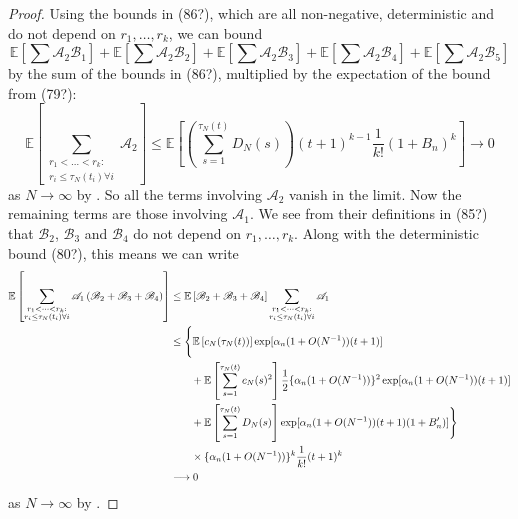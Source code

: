 \documentclass{article}
\newcommand{\E}{\mathbb{E}}
\newcommand{\1}[1]{\mathbbm{1}_{#1}}
\begin{document}
\begin{proof}
Using the bounds in (86?), which are all non-negative, deterministic and do not depend on $r_1,\dots,r_k$, we can bound
\begin{equation}
\E\left[ \sum \mathscr{A}_2 \mathscr{B}_1 \right] + \E\left[ \sum \mathscr{A}_2 \mathscr{B}_2 \right] + \E\left[ \sum \mathscr{A}_2 \mathscr{B}_3 \right] + \E\left[ \sum \mathscr{A}_2 \mathscr{B}_4 \right] + \E\left[ \sum \mathscr{A}_2 \mathscr{B}_5 \right]
\end{equation}
by the sum of the bounds in (86?), multiplied by the expectation of the bound from (79?):
\begin{equation}
\E\left[ \sum_{\substack{r_1 <\dots< r_k :\\ r_i \leq \tau_N(t_i) \forall i}} \mathscr{A}_2 \right]
\leq \E\left[ \left( \sum_{s=1}^{\tau_N(t)} D_N(s) \right) (t+1)^{k-1} \frac{1}{k!} (1+B_n)^k \right]
\longrightarrow 0
\end{equation}
as $N\to\infty$ by \citet[Equation (4)]{brown2020}. 
So all the terms involving $\mathscr{A}_2$ vanish in the limit.
Now the remaining terms are those involving $\mathscr{A}_1$.
We see from their definitions in (85?) that $\mathscr{B}_2$, $\mathscr{B}_3$ and $\mathscr{B}_4$ do not depend on $r_1,\dots, r_k$. Along with the deterministic bound (80?), this means we can write
\begin{align}
\E\left[ \sum_{\substack{r_1 <\dots< r_k :\\ r_i \leq \tau_N(t_i) \forall i}} \mathscr{A}_1 \left( \mathscr{B}_2 + \mathscr{B}_3 + \mathscr{B}_4 \right) \right]
&\leq \E\left[ \mathscr{B}_2 + \mathscr{B}_3 + \mathscr{B}_4 \right] \sum_{\substack{r_1 <\dots< r_k :\\ r_i \leq \tau_N(t_i) \forall i}} \mathscr{A}_1 \notag\\
&\leq \Bigg\{
\E\left[ c_N(\tau_N(t)) \right] \exp[ \alpha_n (1+O(N^{-1})) (t+1) ] \notag\\
&\qquad+ \E\left[ \sum_{s=1}^{\tau_N(t)} c_N(s)^2 \right]
\frac{1}{2} \{ \alpha_n (1+O(N^{-1})) \}^2 \exp[ \alpha_n (1+O(N^{-1})) (t+1) ] \notag\\
&\qquad+ \E\left[ \sum_{s=1}^{\tau_N(t)} D_N(s) \right]
\exp[ \alpha_n (1+O(N^{-1})) (t+1) (1+B_n^\prime) ]
\Bigg\} \notag\\
&\qquad\times \{ \alpha_n (1+O(N^{-1})) \}^k \frac{1}{k!} (t+1)^k \notag\\
&\longrightarrow 0
\end{align}
as $N\to\infty$ by \citet[Equations (3)--(5)]{brown2020}.


\end{proof}
\end{document}
